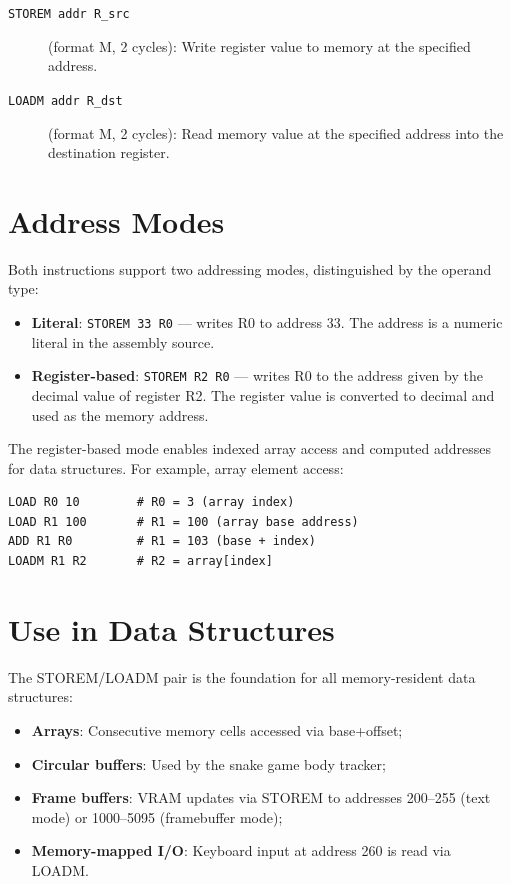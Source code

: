 \documentclass[10pt,a4paper,twoside]{book}
\begin{document}
\begin{description}
    \item[\texttt{STOREM addr R\_src}] (format M, 2 cycles): Write register value
          to memory at the specified address.
    \item[\texttt{LOADM addr R\_dst}] (format M, 2 cycles): Read memory value at
          the specified address into the destination register.
\end{description}

\section{Address Modes}

Both instructions support two addressing modes, distinguished by the operand type:
\begin{itemize}
    \item \textbf{Literal}: \texttt{STOREM 33 R0} — writes R0 to address 33.
          The address is a numeric literal in the assembly source.
    \item \textbf{Register-based}: \texttt{STOREM R2 R0} — writes R0 to the
          address given by the decimal value of register R2. The register value is
          converted to decimal and used as the memory address.
\end{itemize}

The register-based mode enables indexed array access and computed addresses for
data structures. For example, array element access:
\begin{lstlisting}
LOAD R0 10        # R0 = 3 (array index)
LOAD R1 100       # R1 = 100 (array base address)
ADD R1 R0         # R1 = 103 (base + index)
LOADM R1 R2       # R2 = array[index]
\end{lstlisting}

\section{Use in Data Structures}

The STOREM/LOADM pair is the foundation for all memory-resident data structures:
\begin{itemize}
    \item \textbf{Arrays}: Consecutive memory cells accessed via base+offset;
    \item \textbf{Circular buffers}: Used by the snake game body tracker;
    \item \textbf{Frame buffers}: VRAM updates via STOREM to addresses 200--255
          (text mode) or 1000--5095 (framebuffer mode);
    \item \textbf{Memory-mapped I/O}: Keyboard input at address 260 is read via
          LOADM.
\end{itemize}
\end{document}
